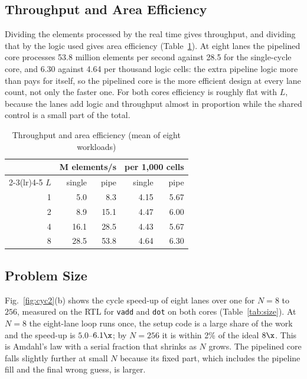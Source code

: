 \subsection{Throughput and Area Efficiency}
Dividing the elements processed by the real time gives throughput, and dividing that by
the logic used gives area efficiency (Table~\ref{tab:eff}). At eight lanes the pipelined
core processes 53.8 million elements per second against 28.5 for the single-cycle core,
and 6.30 against 4.64 per thousand logic cells: the extra pipeline logic more than pays
for itself, so the pipelined core is the more efficient design at every lane count, not
only the faster one. For both cores efficiency is roughly flat with $L$, because the
lanes add logic and throughput almost in proportion while the shared control is a small
part of the total.

\begin{table}[t]
\centering
\caption{Throughput and area efficiency (mean of eight workloads)}
\label{tab:eff}
\footnotesize
\begin{tabular}{@{}rrrrr@{}}
\toprule
 & \multicolumn{2}{c}{M elements/s} & \multicolumn{2}{c}{per 1,000 cells} \\
\cmidrule(lr){2-3}\cmidrule(lr){4-5}
$L$ & single & pipe & single & pipe \\
\midrule
1 & 5.0  & 8.3  & 4.15 & 5.67 \\
2 & 8.9  & 15.1 & 4.47 & 6.00 \\
4 & 16.1 & 28.5 & 4.43 & 5.67 \\
8 & 28.5 & 53.8 & 4.64 & 6.30 \\
\bottomrule
\end{tabular}
\end{table}

\subsection{Problem Size}
Fig.~\ref{fig:cyc2}(b) shows the cycle speed-up of eight lanes over one for
$N = 8$ to $256$, measured on the RTL for \texttt{vadd} and \texttt{dot} on both cores
(Table~\ref{tab:size}). At $N = 8$ the eight-lane loop runs once, the setup code is a
large share of the work and the speed-up is $5.0$--$6.1\x$; by $N = 256$ it is within 2\%
of the ideal $8\x$. This is Amdahl's law with a serial fraction that shrinks as $N$
grows. The pipelined core falls slightly further at small $N$ because its fixed part,
which includes the pipeline fill and the final wrong guess, is larger.

